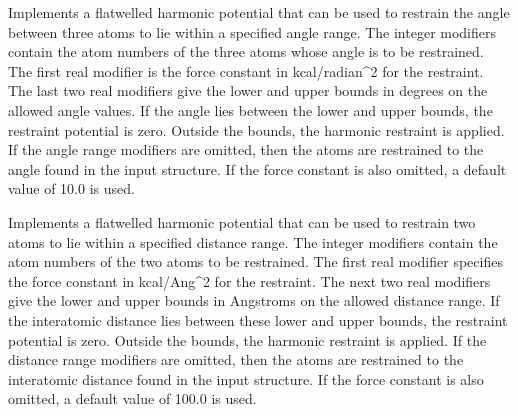 \documentclass[letterpaper,11pt,english]{sphinxmanual}
\begin{document}
\ignorespaces {}\label{\detokenize{text/keywords:key-restrain-angle}}\begin{description}
\sphinxAtStartPar
Implements a flat\sphinxhyphen{}welled harmonic potential that can be used to restrain the angle between three atoms to lie within a specified angle range. The integer modifiers contain the atom numbers of the three atoms whose angle is to be restrained.  The first real modifier is the force constant in kcal/radian\textasciicircum{}2 for the restraint. The last two real modifiers give the lower and upper bounds in degrees on the allowed angle values. If the angle lies between the lower and upper bounds, the restraint potential is zero. Outside the bounds, the harmonic restraint is applied. If the angle range modifiers are omitted, then the atoms are restrained to the angle found in the input structure. If the force constant is also omitted, a default value of 10.0 is used.

\end{description}

\ignorespaces {}\label{\detokenize{text/keywords:key-restrain-distance}}\begin{description}
\sphinxAtStartPar
Implements a flat\sphinxhyphen{}welled harmonic potential that can be used to restrain two atoms to lie within a specified distance range. The integer modifiers contain the atom numbers of the two atoms to be restrained. The first real modifier specifies the force constant in kcal/Ang\textasciicircum{}2 for the restraint. The next two real modifiers give the lower and upper bounds in Angstroms on the allowed distance range. If the interatomic distance lies between these lower and upper bounds, the restraint potential is zero. Outside the bounds, the harmonic restraint is applied. If the distance range modifiers are omitted, then the atoms are restrained to the interatomic distance found in the input structure. If the force constant is also omitted, a default value of 100.0 is used.

\end{description}
\end{document}
